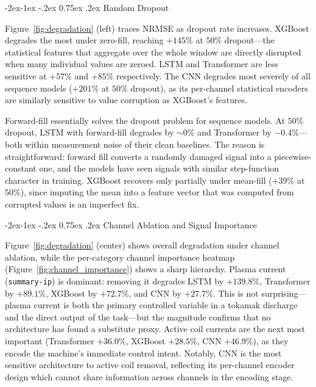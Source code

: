 \documentclass[10pt,twocolumn]{article}
\makeatletter
\renewcommand\subsection{\@startsection{subsection}{2}{\z@}%
  {-2ex\@plus -1ex \@minus -.2ex}%
  {0.75ex \@plus .2ex}%
  {\normalfont\large\bfseries}}
\makeatother
\begin{document}
\subsection{Random Dropout}

Figure~\ref{fig:degradation} (left) traces NRMSE as dropout rate
increases. XGBoost degrades the most under zero-fill, reaching $+145\%$
at $50\%$ dropout—the statistical features that aggregate over the
whole window are directly disrupted when many individual values are
zeroed. LSTM and Transformer are less sensitive at $+57\%$ and $+85\%$
respectively. The CNN degrades most severely of all sequence models
($+201\%$ at $50\%$ dropout), as its per-channel statistical encoders
are similarly sensitive to value corruption as XGBoost's features.

Forward-fill essentially solves the dropout problem for sequence models.
At $50\%$ dropout, LSTM with forward-fill degrades by ${\sim}0\%$ and
Transformer by $-0.4\%$—both within measurement noise of their clean
baselines. The reason is straightforward: forward fill converts a
randomly damaged signal into a piecewise-constant one, and the models
have seen signals with similar step-function character in training.
XGBoost recovers only partially under mean-fill ($+39\%$ at $50\%$),
since imputing the mean into a feature vector that was computed from
corrupted values is an imperfect fix.

\subsection{Channel Ablation and Signal Importance}

Figure~\ref{fig:degradation} (center) shows overall degradation under
channel ablation, while the per-category channel importance heatmap
(Figure~\ref{fig:channel_importance})
shows a sharp hierarchy. Plasma current (\texttt{summary-ip}) is
dominant: removing it degrades LSTM by $+139.8\%$, Transformer by
$+89.1\%$, XGBoost by $+72.7\%$, and CNN by $+27.7\%$. This is not
surprising—plasma current is both the primary controlled variable in
a tokamak discharge and the direct output of the task—but the
magnitude confirms that no architecture has found a substitute proxy.
Active coil currents are the next most important (Transformer $+36.0\%$,
XGBoost $+28.5\%$, CNN $+46.9\%$), as they encode the machine's
immediate control intent. Notably, CNN is the most sensitive
architecture to active coil removal, reflecting its per-channel
encoder design which cannot share information across channels in the
encoding stage.
\end{document}

